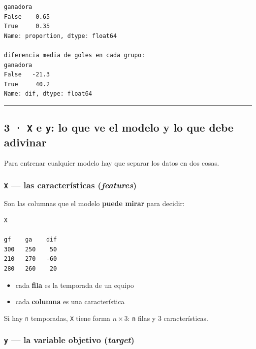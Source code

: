 \documentclass[
]{article}
\providecommand{\tightlist}{%
  \setlength{\itemsep}{0pt}\setlength{\parskip}{0pt}}
\begin{document}
\begin{verbatim}
ganadora
False    0.65
True     0.35
Name: proportion, dtype: float64

diferencia media de goles en cada grupo:
ganadora
False   -21.3
True     40.2
Name: dif, dtype: float64
\end{verbatim}

\protect{}\label{zqsjgHc7nYyP}
\begin{center}\rule{0.5\linewidth}{0.5pt}\end{center}

\subsection{\texorpdfstring{3 · \texttt{X} e \texttt{y}: lo que ve el
modelo y lo que debe
adivinar}{3 · X e y: lo que ve el modelo y lo que debe adivinar}}\label{3--x-e-y-lo-que-ve-el-modelo-y-lo-que-debe-adivinar}

Para entrenar cualquier modelo hay que separar los datos en dos cosas.

\subsubsection{\texorpdfstring{\texttt{X} --- las características
(\emph{features})}{X --- las características (features)}}\label{x--las-caracteruxedsticas-features}

Son las columnas que el modelo \textbf{puede mirar} para decidir:

\begin{verbatim}
X

gf    ga    dif
300   250    50
210   270   -60
280   260    20
\end{verbatim}

\begin{itemize}
\tightlist
\item
  cada \textbf{fila} es la temporada de un equipo
\item
  cada \textbf{columna} es una característica
\end{itemize}

Si hay \texttt{n} temporadas, \texttt{X} tiene forma \(n \times 3\):
\texttt{n} filas y 3 características.

\subsubsection{\texorpdfstring{\texttt{y} --- la variable objetivo
(\emph{target})}{y --- la variable objetivo (target)}}\label{y--la-variable-objetivo-target}
\end{document}
